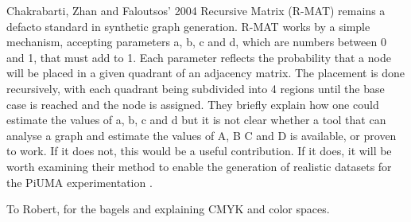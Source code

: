 \documentclass[sigconf,anonymous, authordraft]{acmart}
\begin{document}
\par{Chakrabarti, Zhan and Faloutsos' 2004 Recursive Matrix (R-MAT) remains a defacto standard in synthetic graph generation. 
R-MAT works by a simple mechanism, accepting parameters a, b, c and d, which are numbers between 0 and 1, that must add to 1. 
Each parameter reflects the probability that a node will be placed in a given quadrant of an adjacency matrix. 
The placement is done recursively, with each quadrant being subdivided into 4 regions until the base case is reached and the node is assigned. 
They briefly explain how one could estimate the values of a, b, c and d but it is not clear whether a tool that can analyse a graph and estimate the values of A, B C and D is available, or proven to work. 
If it does not, this would be a useful contribution. 
If it does, it will be worth examining their method to enable the generation of realistic datasets for the PiUMA experimentation \cite{Chakrabarti2004}.}


\begin{acks}
To Robert, for the bagels and explaining CMYK and color spaces.
\end{acks}




\end{document}
